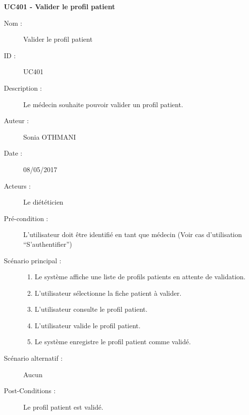 \textbf{UC401 - Valider le profil patient}
\begin{description}
\item [Nom :] Valider le profil patient
\item [ID :] UC401
\item [Description :] Le médecin souhaite pouvoir valider un profil patient.
\item [Auteur :] Sonia OTHMANI
\item [Date :] 08/05/2017
\item [Acteurs :] Le diététicien
\item [Pré-condition :] L’utilisateur doit être identifié en tant que médecin (Voir cas d’utilisation \enquote{S’authentifier})
\item [Scénario principal :]
  \begin{enumerate}
  \item Le système affiche une liste de profils patients en attente de validation.
  \item L’utilisateur sélectionne la fiche patient à valider.
  \item L’utilisateur consulte le profil patient.
  \item L’utilisateur valide le profil patient.
  \item Le système enregistre le profil patient comme validé.
  \end{enumerate}
\item [Scénario alternatif :] Aucun
\item [Post-Conditions :] Le profil patient est validé.
\end{description}


